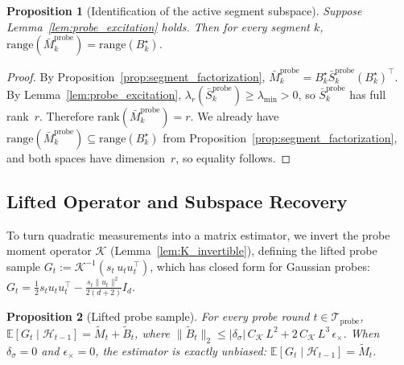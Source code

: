 \documentclass[11pt]{article}
\newcommand{\E}{\mathbb{E}}
\newcommand{\cH}{\mathcal{H}}
\newcommand{\cTprobe}{\mathcal{T}_{\mathrm{probe}}}
\newcommand{\rank}{\mathrm{rank}}
\newcommand{\range}{\mathrm{range}}
\newtheorem{proposition}{Proposition}
\begin{document}
\begin{proposition}[Identification of the active segment subspace]
\label{prop:subspace_identification}
Suppose Lemma~\ref{lem:probe_excitation} holds.
Then for every segment $k$,
$\range(\bar{M}_k^{\mathrm{probe}}) = \range(B_k^\star)$.
\end{proposition}

\begin{proof}
By Proposition~\ref{prop:segment_factorization},
$\bar{M}_k^{\mathrm{probe}}
= B_k^\star\bar{S}_k^{\mathrm{probe}}(B_k^\star)^\top$.
By Lemma~\ref{lem:probe_excitation},
$\lambda_r(\bar{S}_k^{\mathrm{probe}})\ge\lambda_{\min}>0$,
so $\bar{S}_k^{\mathrm{probe}}$ has full rank~$r$.
Therefore $\rank(\bar{M}_k^{\mathrm{probe}})=r$.
We already have
$\range(\bar{M}_k^{\mathrm{probe}})\subseteq\range(B_k^\star)$ from
Proposition~\ref{prop:segment_factorization}, and both spaces have dimension~$r$,
so equality follows.
\end{proof}

\subsection{Lifted Operator and Subspace Recovery}
\label{sec:id_lifted}

To turn quadratic measurements into a matrix estimator, we invert the probe moment
operator $\mathcal{K}$ (Lemma~\ref{lem:K_invertible}), defining the lifted probe sample
$G_t := \mathcal{K}^{-1}(s_t\,u_tu_t^\top)$,
which has closed form for Gaussian probes:
$G_t = \frac{1}{2}s_t u_tu_t^\top - \frac{s_t\|u_t\|^2}{2(d{+}2)}I_d$.

\begin{proposition}[Lifted probe sample]
\label{prop:lifted_probe_unbiased}
For every probe round $t\in\cTprobe$,
$\E[G_t\mid\cH_{t-1}] = \widetilde{M}_t + \widetilde{B}_t$,
where
$\|\widetilde{B}_t\|_2
\le |\delta_\sigma|\,C_{\mathcal{K}}\,L^2
   + 2\,C_{\mathcal{K}}\,L^3\,\epsilon_\times$.
When $\delta_\sigma=0$ and $\epsilon_\times=0$, the estimator is exactly unbiased:
$\E[G_t\mid\cH_{t-1}]=\widetilde{M}_t$.
\end{proposition}
\end{document}

